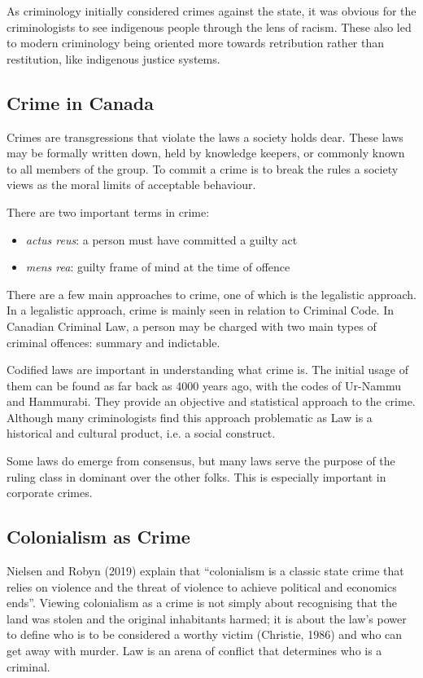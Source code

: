 \documentclass[11pt]{article}
\begin{document}
As criminology initially considered crimes against the state, it was obvious for the criminologists to see indigenous people through the lens of racism. These also led to modern criminology being oriented more towards retribution rather than restitution, like indigenous justice systems.

\subsection{Crime in Canada}

Crimes are transgressions that violate the laws a society holds dear. These laws may be formally written down, held by knowledge keepers, or commonly known to all members of the group. To commit a crime is to break the rules a society views as the moral limits of acceptable behaviour.

There are two important terms in crime:

\begin{itemize}
    \item 	\textit{actus reus}: a person must have committed a guilty act
    \item 	\textit{mens rea}: guilty frame of mind at the time of offence
\end{itemize}

There are a few main approaches to crime, one of which is the legalistic approach. In a legalistic approach, crime is mainly seen in relation to Criminal Code. In Canadian Criminal Law, a person may be charged with two main types of criminal offences: summary and indictable.

Codified laws are important in understanding what crime is. The initial usage of them can  be found as far back as 4000 years ago, with the codes of Ur-Nammu and Hammurabi. They provide an objective and statistical approach to the crime. Although many criminologists find this approach problematic as Law is a historical and cultural product, i.e. a social construct.

Some laws do emerge from consensus, but many laws serve the purpose of the ruling class in dominant over the other folks. This is especially important in corporate crimes.

\subsection{Colonialism as Crime}
Nielsen and Robyn (2019) explain that “colonialism is a classic state crime that relies on violence and the threat of violence to achieve political and economics ends”. Viewing colonialism as a crime is not simply about recognising that the land was stolen and the original inhabitants harmed; it is about the law’s power to define who is to be considered a worthy victim (Christie, 1986) and who can get away with murder. Law is an arena of conflict that determines who is a criminal.
\end{document}
